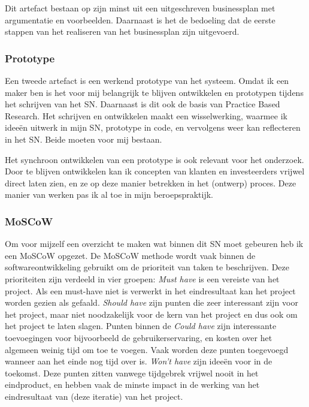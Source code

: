 Dit artefact bestaan op zijn minst uit een uitgeschreven businessplan met argumentatie en voorbeelden. Daarnaast is het de bedoeling dat de eerste stappen van het realiseren van het businessplan zijn uitgevoerd.

\subsubsection*{Prototype}
Een tweede artefact is een werkend prototype van het systeem. Omdat ik een maker ben is het voor mij belangrijk te blijven ontwikkelen en prototypen tijdens het schrijven van het SN. Daarnaast is dit ook de basis van Practice Based Research. Het schrijven en ontwikkelen maakt een wisselwerking, waarmee ik ideeën uitwerk in mijn SN, prototype in code, en vervolgens weer kan reflecteren in het SN. Beide moeten voor mij bestaan.

Het synchroon ontwikkelen van een prototype is ook relevant voor het onderzoek. Door te blijven ontwikkelen kan ik concepten van klanten en investeerders vrijwel direct laten zien, en ze op deze manier betrekken in het (ontwerp) proces. Deze manier van werken pas ik al toe in mijn beroepspraktijk.

\subsubsection*{MoSCoW}
Om voor mijzelf een overzicht te maken wat binnen dit SN moet gebeuren heb ik een MoSCoW opgezet. De MoSCoW methode wordt vaak binnen de softwareontwikkeling gebruikt om de prioriteit van taken te beschrijven. Deze prioriteiten zijn verdeeld in vier groepen: \textit{Must have} is een vereiste van het project. Als een must-have niet is verwerkt in het eindresultaat kan het project worden gezien als gefaald. \textit{Should have} zijn punten die zeer interessant zijn voor het project, maar niet noodzakelijk voor de kern van het project en dus ook om het project te laten slagen. Punten binnen de \textit{Could have} zijn interessante toevoegingen voor bijvoorbeeld de gebruikerservaring, en kosten over het algemeen weinig tijd om toe te voegen. Vaak worden deze punten toegevoegd wanneer aan het einde nog tijd over is. \textit{Won't have} zijn ideeën voor in de toekomst. Deze punten zitten vanwege tijdgebrek vrijwel nooit in het eindproduct, en hebben vaak de minste impact in de werking van het eindresultaat van (deze iteratie) van het project.

